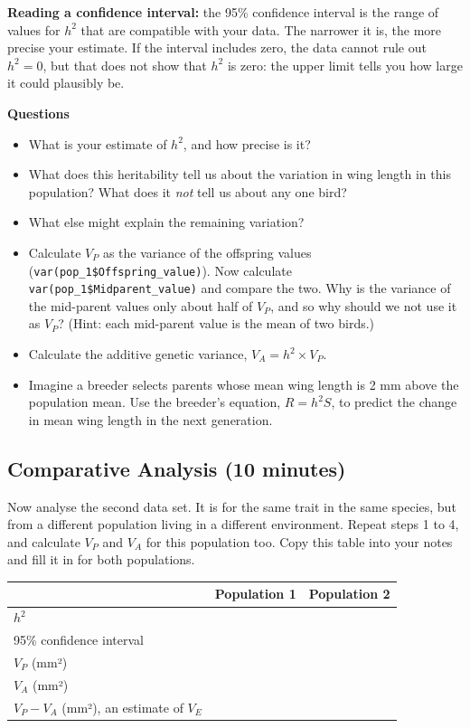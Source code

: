 \documentclass[
  a4paper]{book}
\newcounter{none} %
\providecommand{\tightlist}{%
  \setlength{\itemsep}{0pt}\setlength{\parskip}{0pt}}
\begin{document}
\textbf{Reading a confidence interval:} the 95\% confidence interval is the range of values for \(h^2\) that are compatible with your data. The narrower it is, the more precise your estimate. If the interval includes zero, the data cannot rule out \(h^2 = 0\), but that does not show that \(h^2\) is zero: the upper limit tells you how large it could plausibly be.

\textbf{Questions}

\begin{itemize}
\tightlist
\item
  What is your estimate of \(h^2\), and how precise is it?
\item
  What does this heritability tell us about the variation in wing length in this population? What does it \emph{not} tell us about any one bird?
\item
  What else might explain the remaining variation?
\item
  Calculate \(V_P\) as the variance of the offspring values (\texttt{var(pop\_1\$Offspring\_value)}). Now calculate \texttt{var(pop\_1\$Midparent\_value)} and compare the two. Why is the variance of the mid-parent values only about half of \(V_P\), and so why should we not use it as \(V_P\)? (Hint: each mid-parent value is the mean of two birds.)
\item
  Calculate the additive genetic variance, \(V_A = h^2 \times V_P\).
\item
  Imagine a breeder selects parents whose mean wing length is 2 mm above the population mean. Use the breeder's equation, \(R = h^2 S\), to predict the change in mean wing length in the next generation.
\end{itemize}

\subsection{Comparative Analysis (10 minutes)}\label{comparative-analysis-10-minutes}

Now analyse the second data set. It is for the same trait in the same species, but from a different population living in a different environment. Repeat steps 1 to 4, and calculate \(V_P\) and \(V_A\) for this population too. Copy this table into your notes and fill it in for both populations.

{\def\LTcaptype{none} %
\begin{longtable}[]{@{}lll@{}}
\toprule\noalign{}
& Population 1 & Population 2 \\
\midrule\noalign{}
\endhead
\bottomrule\noalign{}
\endlastfoot
\(h^2\) & & \\
95\% confidence interval & & \\
\(V_P\) (mm²) & & \\
\(V_A\) (mm²) & & \\
\(V_P - V_A\) (mm²), an estimate of \(V_E\) & & \\
\end{longtable}
}
\end{document}
